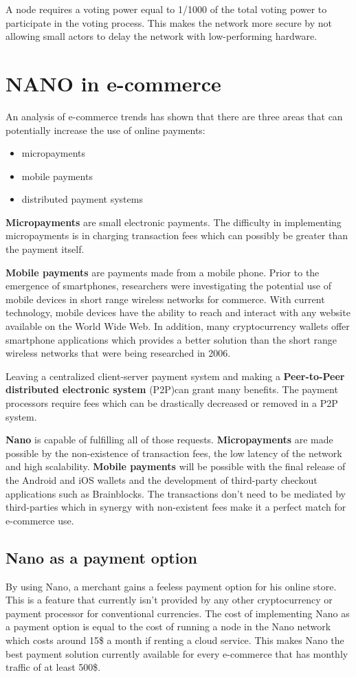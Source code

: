 \documentclass{ferseminar}
\begin{document}
A node requires a voting power equal to 1/1000 of the total voting power to participate in the voting process. This makes the network more secure by not allowing small actors to delay the network with low-performing hardware.


\section{NANO in e-commerce}
An analysis of e-commerce trends \cite{Lowry} has shown that there are three areas that can potentially increase the use of online payments:
\begin{itemize}
	\item micropayments
	\item mobile payments
	\item distributed payment systems
\end{itemize}

\textbf{Micropayments} are small electronic payments. The difficulty in implementing micropayments is in charging transaction fees which can possibly be greater than the payment itself.

\textbf{Mobile payments} are payments made from a mobile phone. Prior to the emergence of smartphones, researchers were investigating the potential use of mobile devices in short range wireless networks for commerce. With current technology, mobile devices have the ability to reach and interact with any website available on the World Wide Web. In addition, many cryptocurrency wallets offer smartphone applications which provides a better solution than the short range wireless networks that were being researched in 2006.  

Leaving a centralized client-server payment system and making a \textbf{Peer-to-Peer distributed electronic system} (P2P)can grant many benefits. The payment processors require fees which can be drastically decreased or removed in a P2P system.

\textbf{Nano} is capable of fulfilling all of those requests. \textbf{Micropayments} are made possible by the non-existence of transaction fees, the low latency of the network and high scalability. \textbf{Mobile payments} will be possible with the final release of the Android and iOS wallets and the development of third-party checkout applications such as Brainblocks. The transactions don't need to be mediated by third-parties which in synergy with non-existent fees make it a perfect match for e-commerce use.

\subsection{Nano as a payment option}
By using Nano, a merchant gains a feeless payment option for his online store. This is a feature that currently isn't provided by any other cryptocurrency or payment processor for conventional currencies. The cost of implementing Nano as a payment option is equal to the cost of running a node in the Nano network which costs around 15\$ a month if renting a cloud service. This makes Nano the best payment solution currently available for every e-commerce that has monthly traffic of at least 500\$.
\end{document}
